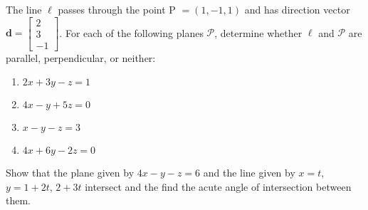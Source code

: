 \documentclass[11pt,letterpaper,boxed]{hmcpset}
\begin{document}


\pagebreak


\begin{problem}[\#18] 
The line $\ell$ passes through the point P $= (1,-1,1)$ and has direction vector $\textbf{d}=\begin{bmatrix} 2 \\ 3 \\ -1 \end{bmatrix}$. For each of the following planes $\mathscr{P}$, determine whether $\ell$ and $\mathscr{P}$ are parallel, perpendicular, or neither:
\begin{enumerate}
\item $2x + 3y - z = 1$
\item $4x - y + 5z = 0$
\item $x - y - z = 3$
\item $4x + 6y - 2z = 0$
\end{enumerate}
\end{problem}



\pagebreak


\begin{problem}[\#46] 
Show that the plane given by $4x-y-z=6$ and the line given by $x=t$, $y=1+2t$, $2+3t$ intersect and the find the acute angle of intersection between them.
\end{problem}



\pagebreak

\end{document}
